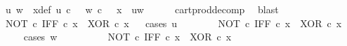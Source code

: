 \begin{isabellebody}
\ u\ w\ \ x{\isacharunderscore}{\kern0pt}def{\isacharcolon}{\kern0pt}\ {\isachardoublequoteopen}u\ {\isasymin}\isactrlsub c\ {\isasymOmega}\ {\isasymand}\ w\ {\isasymin}\isactrlsub c\ {\isasymOmega}\ {\isasymand}\ x\ {\isacharequal}{\kern0pt}\ {\isasymlangle}u{\isacharcomma}{\kern0pt}w{\isasymrangle}{\isachardoublequoteclose}\isanewline
\ \ \ \ \isamarkupfalse%
\ cart{\isacharunderscore}{\kern0pt}prod{\isacharunderscore}{\kern0pt}decomp\ \isamarkupfalse%
\ blast\isanewline
\ \ \isamarkupfalse%
\ {\isachardoublequoteopen}{\isacharparenleft}{\kern0pt}NOT\ {\isasymcirc}\isactrlsub c\ IFF{\isacharparenright}{\kern0pt}\ {\isasymcirc}\isactrlsub c\ x\ {\isacharequal}{\kern0pt}\ XOR\ {\isasymcirc}\isactrlsub c\ x{\isachardoublequoteclose}\isanewline
\ \ \isamarkupfalse%
{\isacharparenleft}{\kern0pt}cases\ {\isachardoublequoteopen}u\ {\isacharequal}{\kern0pt}\ {\isasymt}{\isachardoublequoteclose}{\isacharparenright}{\kern0pt}\isanewline
\ \ \ \ \isamarkupfalse%
\ {\isachardoublequoteopen}{\isacharparenleft}{\kern0pt}NOT\ {\isasymcirc}\isactrlsub c\ IFF{\isacharparenright}{\kern0pt}\ {\isasymcirc}\isactrlsub c\ x\ {\isacharequal}{\kern0pt}\ XOR\ {\isasymcirc}\isactrlsub c\ x{\isachardoublequoteclose}\isanewline
\ \ \ \ \isamarkupfalse%
{\isacharparenleft}{\kern0pt}cases\ {\isachardoublequoteopen}w\ {\isacharequal}{\kern0pt}\ {\isasymt}{\isachardoublequoteclose}{\isacharparenright}{\kern0pt}\isanewline
\ \ \ \ \ \ \isamarkupfalse%
\ {\isachardoublequoteopen}{\isacharparenleft}{\kern0pt}NOT\ {\isasymcirc}\isactrlsub c\ IFF{\isacharparenright}{\kern0pt}\ {\isasymcirc}\isactrlsub c\ x\ {\isacharequal}{\kern0pt}\ XOR\ {\isasymcirc}\isactrlsub c\ x{\isachardoublequoteclose}\isanewline
\ \ \ \ \ \ \ \ \isamarkupfalse%

\end{isabellebody}
